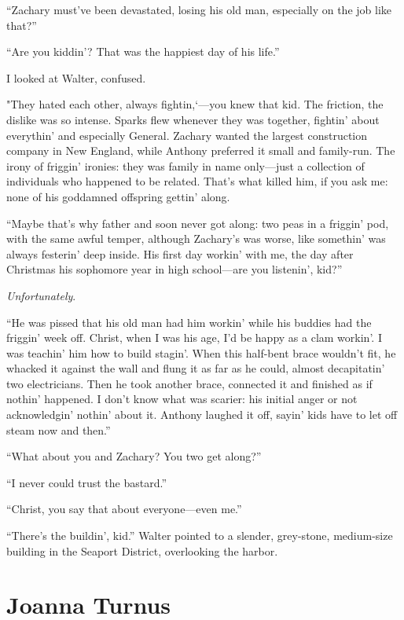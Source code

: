 ``Zachary must've been devastated, losing his old man, especially on the
job like that?''

``Are you kiddin'? That was the happiest day of his life.''

I looked at Walter, confused.

"They hated each other, always fightin,`---you knew that kid. The
friction, the dislike was so intense. Sparks flew whenever they was
together, fightin' about everythin' and especially General. Zachary
wanted the largest construction company in New England, while Anthony
preferred it small and family-run. The irony of friggin' ironies: they
was family in name only---just a collection of individuals who happened
to be related. That's what killed him, if you ask me: none of his
goddamned offspring gettin' along.

``Maybe that's why father and soon never got along: two peas in a
friggin' pod, with the same awful temper, although Zachary's was worse,
like somethin' was always festerin' deep inside. His first day workin'
with me, the day after Christmas his sophomore year in high school---are
you listenin', kid?''

\emph{Unfortunately}.

``He was pissed that his old man had him workin' while his buddies had
the friggin' week off. Christ, when I was his age, I'd be happy as a
clam workin'. I was teachin' him how to build stagin'. When this
half-bent brace wouldn't fit, he whacked it against the wall and flung
it as far as he could, almost decapitatin' two electricians. Then he
took another brace, connected it and finished as if nothin' happened. I
don't know what was scarier: his initial anger or not acknowledgin'
nothin' about it. Anthony laughed it off, sayin' kids have to let off
steam now and then.''

``What about you and Zachary? You two get along?''

``I never could trust the bastard.''

``Christ, you say that about everyone---even me.''

``There's the buildin', kid.'' Walter pointed to a slender, grey-stone,
medium-size building in the Seaport District, overlooking the harbor.

\chapter{Joanna Turnus}

\titlemark

